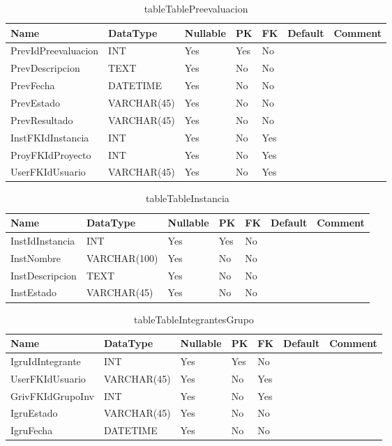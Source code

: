 \begin{table}
	\caption{tableTablePreevaluacion}
	\label{labelTablePreevaluacion}
	\begin{tabular}{ |l|l|l|l|l|l|l| }
		\hline
		Name & DataType & Nullable & PK & FK & Default & Comment \\ \hline
		PrevIdPreevaluacion & INT & Yes & Yes & No &  & \\ \hline 
		PrevDescripcion & TEXT & Yes & No & No &  & \\ \hline 
		PrevFecha & DATETIME & Yes & No & No &  & \\ \hline 
		PrevEstado & VARCHAR(45) & Yes & No & No &  & \\ \hline 
		PrevResultado & VARCHAR(45) & Yes & No & No &  & \\ \hline 
		InstFKIdInstancia & INT & Yes & No & Yes &  & \\ \hline 
		ProyFKIdProyecto & INT & Yes & No & Yes &  & \\ \hline 
		UserFKIdUsuario & VARCHAR(45) & Yes & No & Yes &  & \\ \hline 
		
	\end{tabular}
\end{table}


\begin{table}
	\caption{tableTableInstancia}
	\label{labelTableInstancia}
	\begin{tabular}{ |l|l|l|l|l|l|l| }
		\hline
		Name & DataType & Nullable & PK & FK & Default & Comment \\ \hline
		InstIdInstancia & INT & Yes & Yes & No &  & \\ \hline 
		InstNombre & VARCHAR(100) & Yes & No & No &  & \\ \hline 
		InstDescripcion & TEXT & Yes & No & No &  & \\ \hline 
		InstEstado & VARCHAR(45) & Yes & No & No &  & \\ \hline 
		
	\end{tabular}
\end{table}


\begin{table}
	\caption{tableTableIntegrantesGrupo}
	\label{labelTableIntegrantesGrupo}
	\begin{tabular}{ |l|l|l|l|l|l|l| }
		\hline
		Name & DataType & Nullable & PK & FK & Default & Comment \\ \hline
		IgruIdIntegrante & INT & Yes & Yes & No &  & \\ \hline 
		UserFKIdUsuario & VARCHAR(45) & Yes & No & Yes &  & \\ \hline 
		GrivFKIdGrupoInv & INT & Yes & No & Yes &  & \\ \hline 
		IgruEstado & VARCHAR(45) & Yes & No & No &  & \\ \hline 
		IgruFecha & DATETIME & Yes & No & No &  & \\ \hline 
		
	\end{tabular}
\end{table}


